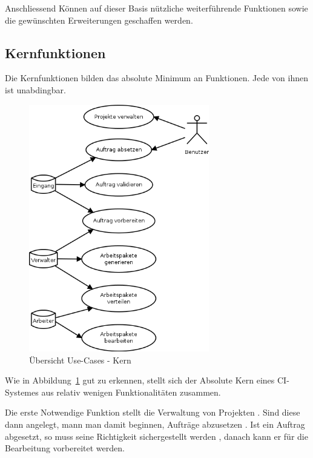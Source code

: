 Anschliessend K\"onnen auf dieser Basis n\"utzliche weiterf\"uhrende Funktionen
sowie die gew\"unschten Erweiterungen geschaffen werden.


\subsection{Kernfunktionen}

Die Kernfunktionen bilden das absolute Minimum an Funktionen.
Jede von ihnen ist unabdingbar.

\begin{figure}[ht]
  \centering
  \includegraphics[width=0.7\textwidth]{imageinput/use-case-muss.png}
  \caption{\"Ubersicht Use-Cases - Kern}
  \label{fig:use-case-muss}
\end{figure}

Wie in Abbildung~\ref{fig:use-case-muss} gut zu erkennen,
stellt sich der Absolute Kern eines CI-Systemes aus relativ wenigen Funktionalit\"aten zusammen.

Die erste Notwendige Funktion stellt die Verwaltung von Projekten .
Sind diese dann angelegt, mann man damit beginnen, Auftr\"age abzusetzen .
Ist ein Auftrag abgesetzt, so muss seine Richtigkeit sichergestellt werden ,
danach kann er f\"ur die Bearbeitung  vorbereitet werden.

